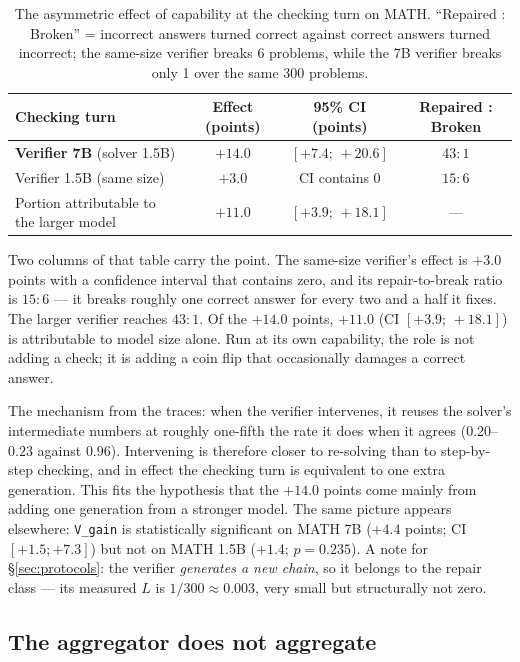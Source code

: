 \documentclass[11pt,a4paper]{article}
\begin{document}
\begin{table}[h]\centering\small
\begin{tabular}{@{}l c c c@{}}
\toprule
Checking turn & Effect (points) & 95\% CI (points) & Repaired : Broken\\
\midrule
\textbf{Verifier 7B} (solver 1.5B) & $\mathbf{+14.0}$ & $[+7.4;\,+20.6]$ & $43:1$\\
Verifier 1.5B (same size) & $+3.0$ & CI contains 0 & $15:6$\\
Portion attributable to the larger model & $+11.0$ & $[+3.9;\,+18.1]$ & ---\\
\bottomrule
\end{tabular}
\caption{The asymmetric effect of capability at the checking turn on MATH. ``Repaired : Broken'' =
incorrect answers turned correct against correct answers turned incorrect; the same-size verifier
breaks 6 problems, while the 7B verifier breaks only 1 over the same 300 problems.}
\label{tab:verifier}
\end{table}

Two columns of that table carry the point. The same-size verifier's effect is $+3.0$ points with a confidence interval that contains zero, and its repair-to-break ratio is $15:6$ --- it breaks roughly one correct answer for every two and a half it fixes. The larger verifier reaches $43:1$. Of the $+14.0$ points, $+11.0$ (CI $[+3.9;\,+18.1]$) is attributable to model size alone. Run at its own capability, the role is not adding a check; it is adding a coin flip that occasionally damages a correct answer.

The mechanism from the traces: when the verifier intervenes, it reuses the solver's intermediate numbers at roughly one-fifth the rate it does when it agrees ($0.20$--$0.23$ against $0.96$). Intervening is therefore closer to re-solving than to step-by-step checking, and in effect the checking turn is equivalent to one extra generation. This fits the hypothesis that the $+14.0$ points come mainly from adding one generation from a stronger model. The same picture appears elsewhere: \texttt{V\_gain} is statistically significant on MATH 7B ($+4.4$ points; CI $[+1.5;+7.3]$) but not on MATH 1.5B ($+1.4$; $p=0.235$). A note for \S\ref{sec:protocols}: the verifier \emph{generates a new chain}, so it belongs to the repair class --- its measured $L$ is $1/300 \approx 0.003$, very small but structurally not zero.

\subsection{The aggregator does not aggregate}\label{sec:aggregatorrole}
\end{document}
